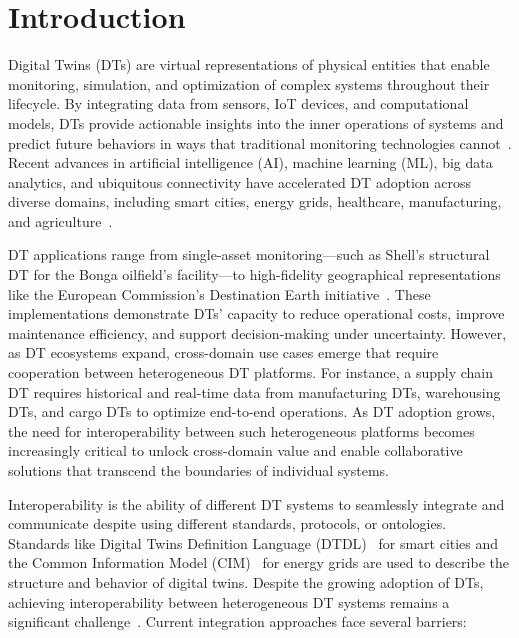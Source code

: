 \chapter{Introduction}
\label{chap:introduction}


Digital Twins (DTs) are virtual representations of physical entities that enable monitoring, simulation, and optimization of complex systems throughout their lifecycle.
By integrating data from sensors, IoT devices, and computational models, DTs provide actionable insights into the inner operations of systems and predict future behaviors in ways that traditional monitoring technologies cannot~\cite{Botín-Sanabria_2022}.
Recent advances in artificial intelligence (AI), machine learning (ML), big data analytics, and ubiquitous connectivity have accelerated DT adoption across diverse domains, including smart cities, energy grids, healthcare, manufacturing, and agriculture~\cite{Kshetri_2021}.

DT applications range from single-asset monitoring---such as Shell's structural DT for the Bonga oilfield's facility---to high-fidelity geographical representations like the European Commission's Destination Earth initiative~\cite{Kshetri_2021}.
These implementations demonstrate DTs' capacity to reduce operational costs, improve maintenance efficiency, and support decision-making under uncertainty.
However, as DT ecosystems expand, cross-domain use cases emerge that require cooperation between heterogeneous DT platforms.
For instance, a supply chain DT \cite{Gerlach_Zarnitz_2021} requires historical and real-time data from manufacturing DTs, warehousing DTs, and cargo DTs to optimize end-to-end operations.
As DT adoption grows, the need for interoperability between such heterogeneous platforms becomes increasingly critical to unlock cross-domain value and enable collaborative solutions that transcend the boundaries of individual systems.


Interoperability is the ability of different DT systems to seamlessly integrate and communicate despite using different standards, protocols, or ontologies.
Standards like Digital Twins Definition Language (DTDL)~\cite{opendigitaltwins_2025} for smart cities and the Common Information Model (CIM)~\cite{Uslar_2012} for energy grids are used to describe the structure and behavior of digital twins.
Despite the growing adoption of DTs, achieving interoperability between heterogeneous DT systems remains a significant challenge~\cite{Tripathi_2024}.
Current integration approaches face several barriers:

